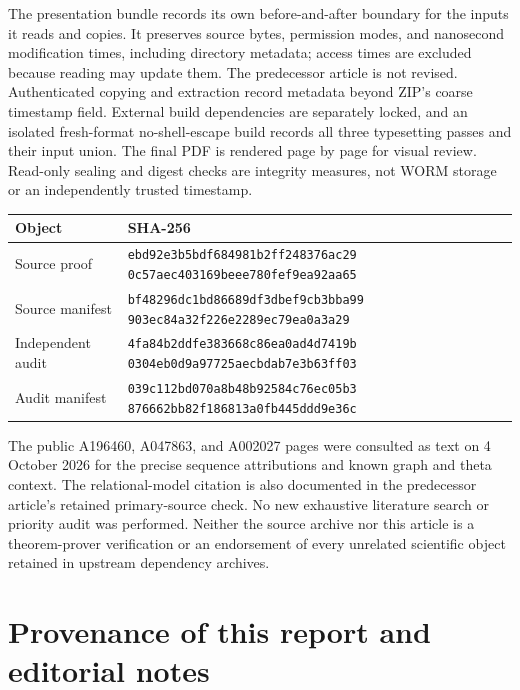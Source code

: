 \documentclass[11pt]{article}
\theoremstyle{definition}
\theoremstyle{remark}
\begin{document}
The presentation bundle records its own before-and-after boundary for
the inputs it reads and copies. It preserves source bytes, permission
modes, and nanosecond modification times, including directory metadata;
access times are excluded because reading may update them. The
predecessor article is not revised. Authenticated copying and extraction
record metadata beyond ZIP's coarse timestamp field. External build
dependencies are separately locked, and an isolated fresh-format
no-shell-escape build records all three typesetting passes and their
input union. The final PDF is rendered page by page for visual review.
Read-only sealing and digest checks are integrity measures, not WORM
storage or an independently trusted timestamp.

\begin{center}
\small
\begin{tabular}{@{}p{}p{}@{}}
\toprule
Object & SHA-256\\
\midrule
Source proof & \texttt{ebd92e3b5bdf684981b2ff248376ac29}\newline
\texttt{0c57aec403169beee780fef9ea92aa65}\\[3pt]
Source manifest & \texttt{bf48296dc1bd86689df3dbef9cb3bba99}\newline
\texttt{903ec84a32f226e2289ec79ea0a3a29}\\[3pt]
Independent audit & \texttt{4fa84b2ddfe383668c86ea0ad4d7419b}\newline
\texttt{0304eb0d9a97725aecbdab7e3b63ff03}\\[3pt]
Audit manifest & \texttt{039c112bd070a8b48b92584c76ec05b3}\newline
\texttt{876662bb82f186813a0fb445ddd9e36c}\\
\bottomrule
\end{tabular}
\end{center}

The public A196460, A047863, and A002027 pages were consulted as text
on 4 October 2026 for the precise sequence attributions and known graph
and theta context. The relational-model citation is also documented in
the predecessor article's retained primary-source check. No new
exhaustive literature search or priority audit was performed. Neither
the source archive nor this article is a theorem-prover verification
or an endorsement of every unrelated scientific object retained in
upstream dependency archives.

\section{Provenance of this report and editorial notes}\label{cta:app:provenance}
\end{document}
